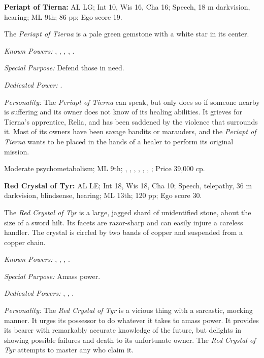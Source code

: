 

\textbf{Periapt of Tierna:}
AL LG;
Int 10, Wis 16, Cha 16;
Speech, 18 m darkvision, hearing;
ML 9th;
86 pp;
Ego score 19.

The \emph{Periapt of Tierna} is a pale green gemstone with a white star in its center.

\textit{Known Powers:}
	, %
	, %
	, %
	, %
	. %

\textit{Special Purpose:} Defend those in need.

\textit{Dedicated Power:} . %

\textit{Personality:} The \emph{Periapt of Tierna} can speak, but only does so if someone nearby is suffering and its owner does not know of its healing abilities. It grieves for Tierna's apprentice, Relia, and has been saddened by the violence that surrounds it. Most of its owners have been savage bandits or marauders, and the \emph{Periapt of Tierna} wants to be placed in the hands of a healer to perform its original mission.

Moderate psychometabolism;
ML 9th;
,
,
,
,
,
,
;
Price 39,000 cp.




\textbf{Red Crystal of Tyr:}
AL LE;
Int 18, Wis 18, Cha 10;
Speech, telepathy, 36 m darkvision, blindsense, hearing;
ML 13th;
120 pp;
Ego score 30.

The \emph{Red Crystal of Tyr} is a large, jagged shard of unidentified stone, about the size of a sword hilt. Its facets are razor-sharp and can easily injure a careless handler. The crystal is circled by two bands of copper and suspended from a copper chain.

\textit{Known Powers:}
	, %
	, %
	, %
	. %

\textit{Special Purpose:} Amass power.

\textit{Dedicated Powers:}
	, %
	, %
	. %

\textit{Personality:} The \emph{Red Crystal of Tyr} is a vicious thing with a sarcastic, mocking manner. It urges its possessor to do whatever it takes to amass power. It provides its bearer with remarkably accurate knowledge of the future, but delights in showing possible failures and death to its unfortunate owner. The \emph{Red Crystal of Tyr} attempts to master any who claim it.

